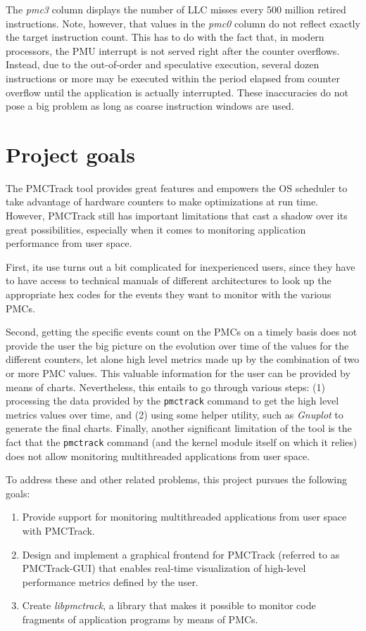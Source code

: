 The \textit{pmc3} column displays the number of LLC misses every 500
million retired instructions. Note, however, that values in the
\textit{pmc0} column do not reflect exactly the target instruction
count. This has to do with the fact that, in modern processors, the PMU
interrupt is not served right after the counter overflows. Instead, due
to the out-of-order and speculative execution, several dozen
instructions or more may be executed within the period elapsed from
counter overflow until the application is actually interrupted. These
inaccuracies do not pose a big problem as long as coarse instruction
windows are used.

\section{Project goals}\label{project-goals}

The PMCTrack tool provides great features and empowers the OS scheduler
to take advantage of hardware counters to make optimizations at
run time. However, PMCTrack still has important limitations that cast a
shadow over its great possibilities, especially when it comes to monitoring application performance from user space.

First, its use turns out a bit complicated for inexperienced
users, since they have to have access to technical manuals of different
architectures to look up the appropriate hex codes for the events they want to monitor with the various PMCs.

Second, getting the specific events count on the PMCs on a timely basis does not provide the user the big picture on the evolution over time of the values for the different counters, let alone high level metrics made up by the
combination of two or more PMC values. This valuable information for the
user can be provided by means of charts. Nevertheless, this entails to go through various steps: (1) processing the data provided by the \texttt{pmctrack} command to
get the high level metrics values over time, and (2) using some helper utility, such as \emph{Gnuplot} to generate the final charts. Finally, another significant limitation of the tool is the fact that the \texttt{pmctrack} command (and the kernel module itself on which it relies) does not allow monitoring multithreaded applications from user space.

To address these and other related problems, this project pursues the following goals:

\begin{enumerate}
\def\labelenumi{\arabic{enumi}.}
\item
  Provide support for monitoring multithreaded applications
  from user space with PMCTrack.
\item
  Design and implement a graphical frontend for PMCTrack (referred to as 
  PMCTrack-GUI) that enables real-time visualization of high-level performance metrics defined by the user.
\item
  Create \emph{libpmctrack}, a library that makes it possible to monitor code fragments of application programs by means of PMCs.
\end{enumerate}

